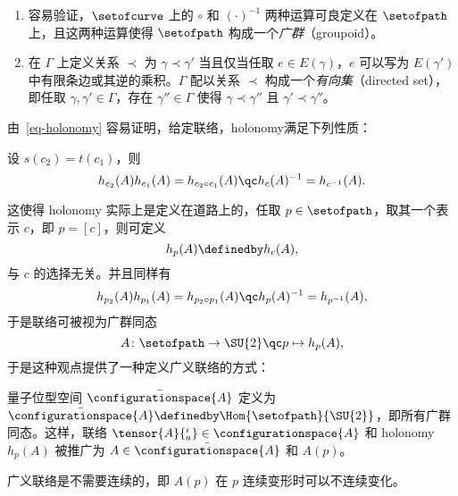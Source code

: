 			\begin{Remark}
				\begin{enumerate}
					\item 容易验证，$\setofcurve$ 上的 $\circ$ 和 $(\cdot)^{-1}$ 两种运算可良定义在 $\setofpath$ 上，且这两种运算使得 $\setofpath$ 构成一个\emph{广群}（groupoid）。
					\item 在 $\Gamma$ 上定义关系 $\prec$ 为 $\gamma \prec \gamma'$ 当且仅当任取 $e\in E(\gamma)$，$e$ 可以写为 $E(\gamma')$ 中有限条边或其逆的乘积。$\Gamma$ 配以关系 $\prec$ 构成一个\emph{有向集}（directed set），即任取 $\gamma,\gamma' \in \Gamma$，存在 $\gamma'' \in \Gamma$ 使得 $\gamma \prec \gamma''$ 且 $\gamma' \prec \gamma''$。
				\end{enumerate}
			\end{Remark}

			由~\eqref{eq-holonomy} 容易证明，给定联络，holonomy满足下列性质：
			\begin{Property}
				设 $s(c_2) = t(c_1)$，则
				\begin{equation}
					h_{c_2}(A) h_{c_1}(A) = h_{c_2 \circ c_1}(A) \qc h_{c}(A)^{-1} = h_{c^{-1}}(A).
				\end{equation}
			\end{Property}
			这使得 holonomy 实际上是定义在道路上的，任取 $p\in \setofpath$，取其一个表示 $c$，即 $p=[c]$，则可定义
			\begin{equation}
				h_p(A) \definedby h_c(A),
			\end{equation}
			与 $c$ 的选择无关。并且同样有
			\begin{equation}
				h_{p_2}(A) h_{p_1}(A) = h_{p_2 \circ p_1}(A) \qc h_{p}(A)^{-1} = h_{p^{-1}}(A),
			\end{equation}
			于是联络可被视为广群同态
			\begin{equation}
				A \colon \setofpath \rightarrow \SU{2} \qc p \mapsto h_p(A),
			\end{equation}
			于是这种观点提供了一种定义广义联络的方式：
			\begin{Definition}[量子位型空间]
				量子位型空间 $\bar{\configurationspace{A}}$ 定义为 $\bar{\configurationspace{A}} \definedby \Hom{\setofpath}{\SU{2}}$，即所有广群同态。这样，联络 $\tensor{A}{^i_a} \in \configurationspace{A}$ 和 holonomy $h_p(A)$ 被推广为 $A \in \bar{\configurationspace{A}}$ 和 $A(p)$。
			\end{Definition}
			广义联络是不需要连续的，即 $A(p)$ 在 $p$ 连续变形时可以不连续变化。


